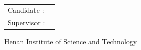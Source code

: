 
\begin{titlepage}
\centering
\vspace*{1.2cm}

{\bfseries{}\HISTTitleEN\par}
\vspace{1.0cm}

{
\DegreeStatementEN \ 
\HISTDegreeEN\par}

\vfill

\ifHISTShowCandidate
{\begin{tabular}{@{}ll@{}}
Candidate  : & \HISTAuthorEN \\
Supervisor : & \HISTSupervisorEN \\
\end{tabular}\par}
\vspace{2.8cm}
\fi


{
Henan Institute of Science and Technology\par
\HISTDateEN\par}

\end{titlepage}
